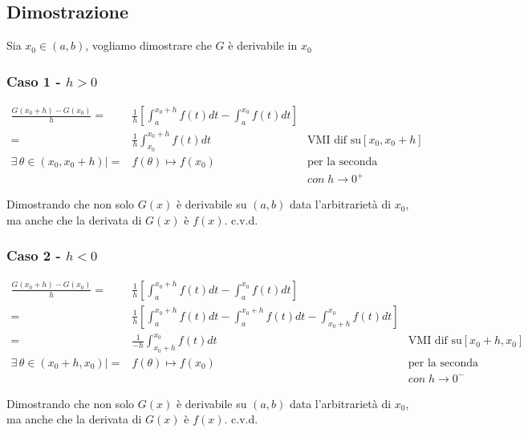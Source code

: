 \documentclass[../dimostrazioni]{subfiles}
\begin{document}
                    \subsection*{Dimostrazione}

                        Sia \(x_0 \in (a,b) \), vogliamo dimostrare che \(G\) è derivabile in \(x_0\)


                        \subsubsection*{Caso 1 - \(h>0\)}

                            \begin{align*}
                                \frac{G(x_0+h) - G(x_0)}{h} =& \frac{1}{h} \left[ \int_{a}^{x_0+h} f(t) dt - \int_{a}^{x_0} f(t)dt \right] \\
                                                            =& \frac{1}{h} \int_{x_0}^{x_0+h}f(t) dt & \text{VMI dif su} [x_0, {x_0} +h]\\
                                \exists \, \theta \in (x_0, x_0+h) | =& f(\theta) \longmapsto f(x_0)          & \text{per la seconda proprietà del VMI}& \\
                                &                            &  con \; h \rightarrow 0^{+}&
                            \end{align*}
                            
                            Dimostrando che non solo \(G(x)\) è derivabile su \((a,b)\) data l'arbitrarietà di \(x_0\), 
                            ma anche che la derivata di \(G(x)\) è \(f(x)\). c.v.d.

                        \subsubsection*{Caso 2 - \(h<0\)}

                            \begin{align*}
                                \frac{G(x_0+h) - G(x_0)}{h} =& \frac{1}{h} \left[ \int_{a}^{x_0+h} f(t) dt - \int_{a}^{x_0} f(t)dt \right] \\
                                                            =& \frac{1}{h} \left[ \int_{a}^{x_0+h} f(t) dt - \int_{a}^{x_0+h} f(t)dt -\int_{x_0+h}^{x_0} f(t)dt \right] \\
                                                            =& \frac{1}{-h} \int_{x_0+h}^{x_0}f(t) dt & \text{VMI dif su} [x_0 + h, x_0]\\
                                \exists \, \theta \in (x_0+h, x_0) | =& f(\theta) \longmapsto f(x_0)          & \text{per la seconda proprietà del VMI}& \\
                                &                            &  con \; h \rightarrow 0^{-}&
                            \end{align*}
                            
                            Dimostrando che non solo \(G(x)\) è derivabile su \((a,b)\) data l'arbitrarietà di \(x_0\), 
                            ma anche che la derivata di \(G(x)\) è \(f(x)\). c.v.d.            
\end{document}
